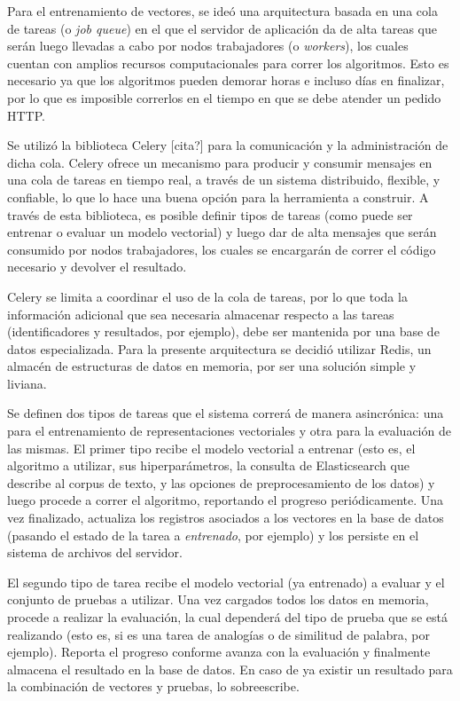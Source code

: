 Para el entrenamiento de vectores, se ideó una arquitectura basada en una cola de tareas (o
\textit{job queue}) en el que el servidor de aplicación da de alta tareas que serán luego llevadas a
cabo por nodos trabajadores (o \textit{workers}), los cuales cuentan con amplios recursos
computacionales para correr los algoritmos. Esto es necesario ya que los algoritmos pueden demorar
horas e incluso días en finalizar, por lo que es imposible correrlos en el tiempo en que se debe
atender un pedido HTTP\@.

Se utilizó la biblioteca Celery [cita?] para la comunicación y la administración de dicha
cola. Celery ofrece un mecanismo para producir y consumir mensajes en una cola de tareas en tiempo
real, a través de un sistema distribuido, flexible, y confiable, lo que lo hace una buena opción
para la herramienta a construir. A través de esta biblioteca, es posible definir tipos de tareas
(como puede ser entrenar o evaluar un modelo vectorial) y luego dar de alta mensajes que serán
consumido por nodos trabajadores, los cuales se encargarán de correr el código necesario y devolver
el resultado.

Celery se limita a coordinar el uso de la cola de tareas, por lo que toda la información adicional
que sea necesaria almacenar respecto a las tareas (identificadores y resultados, por ejemplo), debe
ser mantenida por una base de datos especializada. Para la presente arquitectura se decidió utilizar
Redis, un almacén de estructuras de datos en memoria, por ser una solución simple y liviana.

Se definen dos tipos de tareas que el sistema correrá de manera asincrónica: una para el
entrenamiento de representaciones vectoriales y otra para la evaluación de las mismas. El primer tipo
recibe el modelo vectorial a entrenar (esto es, el algoritmo a utilizar, sus hiperparámetros, la
consulta de Elasticsearch que describe al corpus de texto, y las opciones de preprocesamiento de los
datos) y luego procede a correr el algoritmo, reportando el progreso periódicamente. Una vez
finalizado, actualiza los registros asociados a los vectores en la base de datos (pasando el estado
de la tarea a \textit{entrenado}, por ejemplo) y los persiste en el sistema de archivos del
servidor.

El segundo tipo de tarea recibe el modelo vectorial (ya entrenado) a evaluar y el conjunto de
pruebas a utilizar. Una vez cargados todos los datos en memoria, procede a realizar la evaluación,
la cual dependerá del tipo de prueba que se está realizando (esto es, si es una tarea de analogías o
de similitud de palabra, por ejemplo). Reporta el progreso conforme avanza con la evaluación y
finalmente almacena el resultado en la base de datos. En caso de ya existir un resultado para la
combinación de vectores y pruebas, lo sobreescribe.

